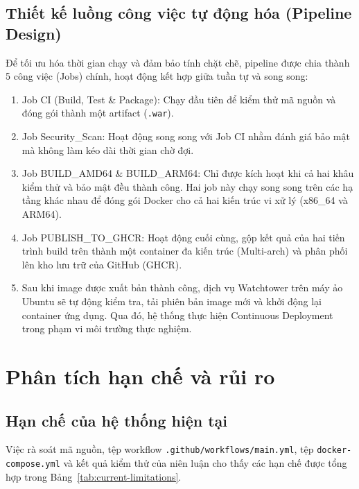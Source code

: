 \documentclass[12pt,a4paper,oneside]{extreport}
\begin{document}
\subsection{Thiết kế luồng công việc tự động hóa (Pipeline Design)}
Để tối ưu hóa thời gian chạy và đảm bảo tính chặt chẽ, pipeline được chia thành
5 công việc (Jobs) chính, hoạt động kết hợp giữa tuần tự và song song:
\begin{enumerate}
  \item Job CI (Build, Test \& Package): Chạy đầu tiên để kiểm thử mã nguồn và
  đóng gói thành một artifact (\texttt{.war}).
  \item Job Security\_Scan: Hoạt động song song với Job CI nhằm đánh giá bảo mật
  mà không làm kéo dài thời gian chờ đợi.
  \item Job BUILD\_AMD64 \& BUILD\_ARM64: Chỉ được kích hoạt khi cả hai khâu
  kiểm thử và bảo mật đều thành công. Hai job này chạy song song trên các hạ
  tầng khác nhau để đóng gói Docker cho cả hai kiến trúc vi xử lý (x86\_64 và
  ARM64).
  \item Job PUBLISH\_TO\_GHCR: Hoạt động cuối cùng, gộp kết quả của hai tiến
  trình build trên thành một container đa kiến trúc (Multi-arch) và phân phối
  lên kho lưu trữ của GitHub (GHCR).
  \item Sau khi image được xuất bản thành công, dịch vụ Watchtower trên máy ảo
  Ubuntu sẽ tự động kiểm tra, tải phiên bản image mới và khởi động lại container
  ứng dụng. Qua đó, hệ thống thực hiện Continuous Deployment trong phạm vi môi
  trường thực nghiệm.
\end{enumerate}

\section{Phân tích hạn chế và rủi ro}
\label{sec:limitations}
\subsection{Hạn chế của hệ thống hiện tại}
Việc rà soát mã nguồn, tệp workflow \texttt{.github/workflows/main.yml}, tệp
\texttt{docker-compose.yml} và kết quả kiểm thử của niên luận cho thấy các hạn
chế được tổng hợp trong Bảng~\ref{tab:current-limitations}.
\end{document}
